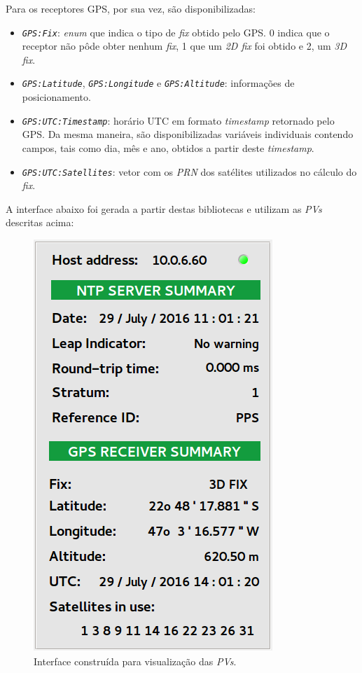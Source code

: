 Para os receptores GPS, por sua vez, são disponibilizadas:

\begin{itemize}

  \renewcommand\labelitemi{--}
  \item \textit{\texttt{GPS:Fix}}: \textit{enum} que indica o tipo de
  \textit{fix} obtido pelo GPS. 0 indica que o receptor não pôde obter nenhum
  \textit{fix}, 1 que um \textit{2D fix} foi obtido e 2, um \textit{3D fix}.
  
  \item \textit{\texttt{GPS:Latitude}}, \textit{\texttt{GPS:Longitude}} e
  \textit{\texttt{GPS:Altitude}}:  informações de posicionamento.

  \item \textit{\texttt{GPS:UTC:Timestamp}}: horário UTC em
  formato \textit{timestamp} retornado pelo GPS. Da mesma maneira, são
  disponibilizadas variáveis individuais contendo campos, tais como dia, mês e
  ano, obtidos a partir deste \textit{timestamp}.
  
  \item  \textit{\texttt{GPS:UTC:Satellites}}: vetor com os \textit{PRN} dos
  satélites utilizados no cálculo do \textit{fix}.
\end{itemize}

A interface abaixo foi gerada a partir destas bibliotecas e utilizam as
\textit{PVs} descritas acima:

\FloatBarrier

\begin{figure}[h]
    
    \centering
    \includegraphics[scale=0.4]{image/epics-opi-ntpgps}
    \caption {\centering Interface construída para visualização das
    \textit{PVs}.}
    \label{img:ntp-opi} 
\end{figure} 

